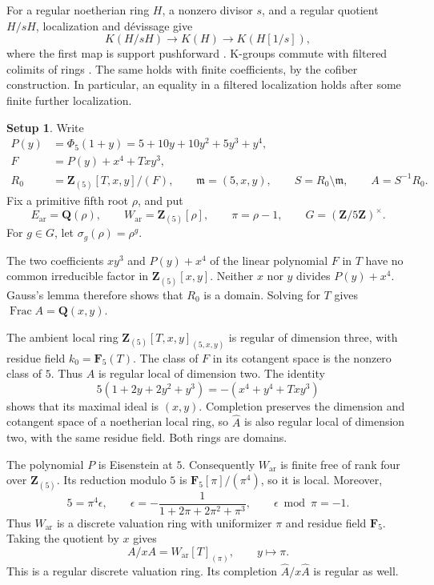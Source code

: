 \documentclass[11pt,a4paper]{amsart}
\numberwithin{equation}{section}
\theoremstyle{definition}
\newtheorem{setup}[theorem]{Setup}
\theoremstyle{remark}
\newcommand{\DtwoZZ}{\mathbf{Z}}
\newcommand{\DtwoQQ}{\mathbf{Q}}
\newcommand{\DtwoFF}{\mathbf{F}}
\newcommand{\Dtwofm}{\mathfrak m}
\newcommand{\Dtwowh}{\widehat}
\newcommand{\Dtwoar}{\mathrm{ar}}
\DeclareMathOperator{\DtwoFrac}{Frac}
\begin{document}
For a regular noetherian ring \(H\), a nonzero divisor \(s\), and a
regular quotient \(H/sH\), localization and d\'evissage give
\[
 K(H/sH)\longrightarrow K(H)\longrightarrow K(H[1/s]),
\]
where the first map is support pushforward
\cite[V.4.1, V.6.1]{Weibel}.
K-groups commute with filtered colimits of rings
\cite[IV, Section~6.4]{Weibel}. The same holds with finite coefficients,
by the cofiber construction. In particular, an equality in a filtered
localization holds after some finite further localization.

\begin{setup}\label{d2:setup:ring}
Write
\[
 \begin{split}
 P(y)&=\Phi _5(1+y)=5+10y+10y^2+5y^3+y^4,\\
 F&=P(y)+x^4+Txy^3,\\
 R_0&=\DtwoZZ _{(5)}[T,x,y]/(F),\qquad
 \Dtwofm=(5,x,y),\qquad
 S=R_0\setminus\Dtwofm,\qquad A=S^{-1}R_0.
 \end{split}
\]
Fix a primitive fifth root \(\rho\), and put
\[
 E_{\Dtwoar}=\DtwoQQ(\rho),\qquad
 W_{\Dtwoar}=\DtwoZZ _{(5)}[\rho],\qquad
 \pi=\rho-1,\qquad
 G=(\DtwoZZ/5\DtwoZZ)^\times.
\]
For \(g\in G\), let \(\sigma_g(\rho)=\rho^g\).
\end{setup}

The two coefficients \(xy^3\) and \(P(y)+x^4\) of the linear polynomial
\(F\) in \(T\) have no common irreducible factor in
\(\DtwoZZ _{(5)}[x,y]\). Neither \(x\) nor \(y\) divides \(P(y)+x^4\).
Gauss's lemma therefore shows that \(R_0\) is a domain.
Solving for \(T\) gives \(\DtwoFrac A=\DtwoQQ(x,y)\).

The ambient local ring
\(\DtwoZZ _{(5)}[T,x,y]_{(5,x,y)}\) is regular of dimension three,
with residue field \(k_0=\DtwoFF _5(T)\).
The class of \(F\) in its cotangent space is the nonzero class of \(5\).
Thus \(A\) is regular local of dimension two. The identity
\begin{equation}\label{d2:eq:ramification}
 5(1+2y+2y^2+y^3)=-(x^4+y^4+Txy^3)
\end{equation}
shows that its maximal ideal is \((x,y)\).
Completion preserves the dimension and cotangent space of a noetherian
local ring, so \(\Dtwowh A\) is also regular local of dimension two, with the
same residue field. Both rings are domains.

The polynomial \(P\) is Eisenstein at \(5\).
Consequently \(W_{\Dtwoar}\) is finite free of rank four over
\(\DtwoZZ _{(5)}\). Its reduction modulo \(5\) is
\(\DtwoFF _5[\pi]/(\pi^4)\), so it is local.
Moreover,
\begin{equation}\label{d2:eq:epsilon}
 5=\pi^4\epsilon,\qquad
 \epsilon=-\frac{1}{1+2\pi+2\pi^2+\pi^3},
 \qquad
 \epsilon\bmod\pi=-1.
\end{equation}
Thus \(W_{\Dtwoar}\) is a discrete valuation ring with uniformizer \(\pi\)
and residue field \(\DtwoFF _5\). Taking the quotient by \(x\) gives
\begin{equation}\label{d2:eq:cartier-quotient}
 A/xA=W_{\Dtwoar}[T]_{(\pi)},
 \qquad y\longmapsto\pi.
\end{equation}
This is a regular discrete valuation ring. Its completion
\(\Dtwowh A/x\Dtwowh A\) is regular as well.
\end{document}
